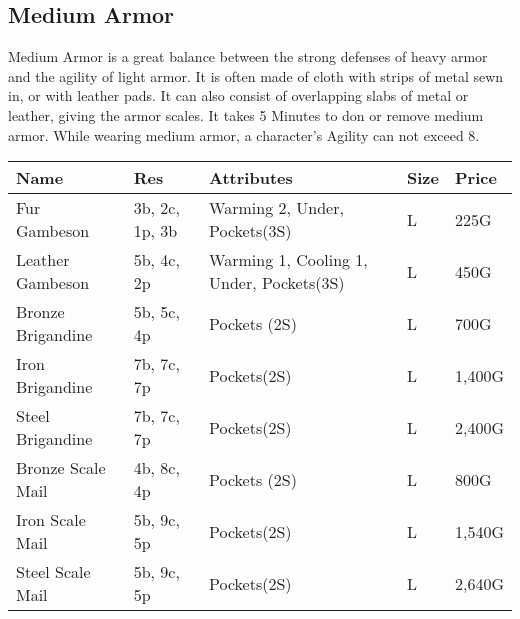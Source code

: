 \subsection{Medium Armor}\label{subsec:mediumArmor}
Medium Armor is a great balance between the strong defenses of heavy armor and the agility of light armor.
It is often made of cloth with strips of metal sewn in, or with leather pads.
It can also consist of overlapping slabs of metal or leather, giving the armor scales.
It takes 5 Minutes to don or remove medium armor.
While wearing medium armor, a character's Agility can not exceed 8.

\begin{longtable}{p{3.5cm} | p{1.5cm} | p{5cm} | p{1cm} | p{1.25cm}}
	Name & Res & Attributes & Size & Price\\ \hline
	Fur Gambeson & 3b, 2c, 1p, 3b & Warming 2, Under, Pockets(3S) & L & 225G\\
	
	Leather Gambeson & 5b, 4c, 2p & Warming 1, Cooling 1, Under, Pockets(3S) & L & 450G\\

	Bronze Brigandine & 5b, 5c, 4p & Pockets (2S) & L & 700G\\

	Iron Brigandine & 7b, 7c, 7p & Pockets(2S) & L & 1,400G\\
	
	Steel Brigandine & 7b, 7c, 7p & Pockets(2S) & L & 2,400G\\

	Bronze Scale Mail & 4b, 8c, 4p & Pockets (2S) & L & 800G\\

	Iron Scale Mail & 5b, 9c, 5p & Pockets(2S) & L & 1,540G\\
	
	Steel Scale Mail & 5b, 9c, 5p & Pockets(2S) & L & 2,640G\\
\end{longtable}